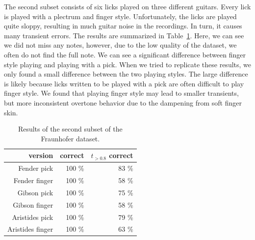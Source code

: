\documentclass[a4paper,10pt,twocolumn]{article}
\begin{document}
The second subset consists of six licks played on three different guitars. Every lick is played with a plectrum and finger style. 
Unfortunately, the licks are played quite sloppy, resulting in much guitar noise in the recordings. In turn, it causes many transient errors. The results are summarized in Table~\ref{tab:expacc2}. Here, we can see we did not miss any notes, however, due to the low quality of the dataset, we often do not find the full note. We can see a significant difference between finger style playing and playing with a pick. When we tried to replicate these results, we only found a small difference between the two playing styles. The large difference is likely because licks written to be played with a pick are often difficult to play finger style. We found that playing finger style may lead to smaller transients, but more inconsistent overtone behavior due to the dampening from soft finger skin.
\begin{table}[h]
    \centering
    \begin{tabular}{r|rr}
        version          & correct & $t_{>0.8}$ correct \\
        \hline
        Fender pick      & 100 \%  & 83 \% \\
        Fender finger    & 100 \%  & 58 \% \\
        Gibson pick      & 100 \%  & 75 \% \\
        Gibson finger    & 100 \%  & 58 \% \\
        Aristides pick   & 100 \%  & 79 \% \\
        Aristides finger & 100 \%  & 63 \%
    \end{tabular}
    \caption{Results of the second subset of the Fraunhofer dataset.}
    \label{tab:expacc2}
\end{table}
\end{document}
